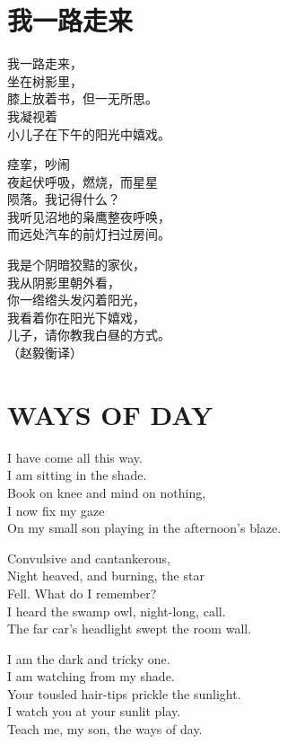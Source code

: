 \documentclass[
]{book}
\renewenvironment{quote}{\begin{VF}}{\end{VF}}
\begin{document}
\hypertarget{section-65}{%
\section{我一路走来}\label{section-65}}

\begin{quote}
我一路走来，\\
坐在树影里，\\
膝上放着书，但一无所思。\\
我凝视着\\
小儿子在下午的阳光中嬉戏。

痉挛，吵闹\\
夜起伏呼吸，燃烧，而星星\\
陨落。我记得什么？\\
我听见沼地的枭鹰整夜呼唤，\\
而远处汽车的前灯扫过房间。

我是个阴暗狡黠的家伙，\\
我从阴影里朝外看，\\
你一绺绺头发闪着阳光，\\
我看着你在阳光下嬉戏，\\
儿子，请你教我白昼的方式。\\
（赵毅衡译）
\end{quote}

\hypertarget{ways-of-day}{%
\section{WAYS OF DAY}\label{ways-of-day}}

\begin{quote}
I have come all this way.\\
I am sitting in the shade.\\
Book on knee and mind on nothing,\\
I now fix my gaze\\
On my small son playing in the afternoon's blaze.

Convulsive and cantankerous,\\
Night heaved, and burning, the star\\
Fell. What do I remember?\\
I heard the swamp owl, night-long, call.\\
The far car's headlight swept the room wall.

I am the dark and tricky one.\\
I am watching from my shade.\\
Your tousled hair-tips prickle the sunlight.\\
I watch you at your sunlit play.\\
Teach me, my son, the ways of day.
\end{quote}
\end{document}
